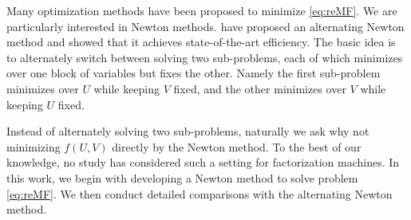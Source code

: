 Many optimization methods have been proposed to minimize \eqref{eq:reMF}. We are particularly interested in Newton methods. \citet{WSC18a} have proposed an alternating Newton method and showed that it achieves state-of-the-art efficiency. The basic idea is to alternately switch between solving two sub-problems, each of which minimizes over one block of variables but fixes the other. Namely the first sub-problem minimizes over $U$ while keeping $V$ fixed, and the other minimizes over $V$ while keeping $U$ fixed.

Instead of alternately solving two sub-problems, naturally we ask why not minimizing $f(U,V)$ directly by the Newton method. To the best of our knowledge, no study has considered such a setting for factorization machines. In this work, we begin with developing a Newton method to solve problem \eqref{eq:reMF}. We then conduct detailed comparisons with the alternating Newton method.